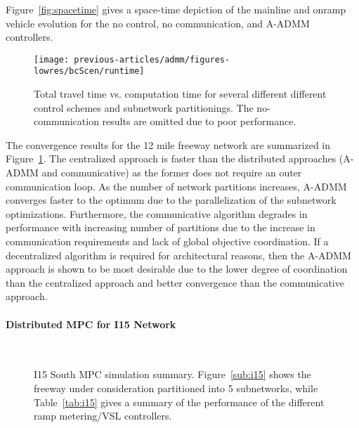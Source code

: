 Figure~\ref{fig:spacetime} gives a space-time depiction of the mainline and onramp vehicle evolution for the no control, no communication, and A-ADMM controllers.

\begin{figure}[t]
  \centering
  \texttt{[image: previous-articles/admm/figures-lowres/bcScen/runtime]}
  \caption{Total travel time vs. computation time for several different different control schemes and subnetwork partitionings. The no-communication results are omitted due to poor performance.}
  \label{fig:runtime}
\end{figure}

The convergence results for the 12 mile freeway network are summarized in Figure~\ref{fig:runtime}. The centralized approach is faster than the distributed approaches (A-ADMM and communicative) as the former does not require an outer communication loop. As the number of network partitions increases, A-ADMM converges faster to the optimum due to the parallelization of the subnetwork optimizations. Furthermore, the communicative algorithm degrades in performance with increasing number of partitions due to the increase in communication requirements and lack of global objective coordination. If a decentralized algorithm is required for architectural reasons, then the A-ADMM approach is shown to be most desirable due to the lower degree of coordination than the centralized approach and better convergence than the communicative approach.

\paragraph{Distributed MPC for I15 Network}

\begin{figure}[ht]
  \centering
   \\
    \caption[I15 South MPC simulation summary for distributed A-ADMM controller.]{I15 South MPC simulation summary. Figure~\ref{sub:i15} shows the freeway under consideration partitioned into 5 subnetworks, while Table~\ref{tab:i15} gives a summary of the performance of the different ramp metering/VSL controllers.}
    \label{fig:i15-admm}
\end{figure}

